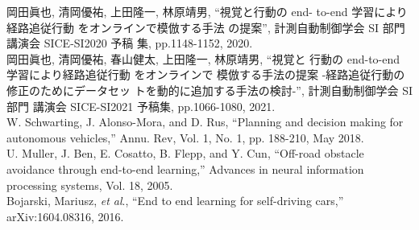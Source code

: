 \documentclass{jsarticle}
\begin{document}
\begin{thebibliography}{99}
  \small
  岡田眞也, 清岡優祐, 上田隆一, 林原靖男, “視覚と行動の end-
  to-end 学習により経路追従行動 をオンラインで模倣する手法
  の提案”, 計測自動制御学会 SI 部門講演会 SICE-SI2020 予稿
  集, pp.1148-1152, 2020.\\
  
  岡田眞也, 清岡優祐, 春山健太, 上田隆一, 林原靖男, “視覚と
  行動の end-to-end 学習により経路追従行動 をオンラインで
  模倣する手法の提案 -経路追従行動の修正のためにデータセッ
  トを動的に追加する手法の検討-”, 計測自動制御学会 SI 部門
  講演会 SICE-SI2021 予稿集, pp.1066-1080, 2021.\\
  
  W. Schwarting, J. Alonso-Mora, and D. Rus,
  “Planning and decision making for
  autonomous vehicles,” Annu. Rev, Vol. 1, No. 1, pp. 188-210, May 2018.\\
  
  U. Muller, J. Ben, E. Cosatto, B. Flepp, and Y. Cun, “Oﬀ-road obstacle avoidance
  through end-to-end learning,” Advances in neural information processing systems,
  Vol. 18, 2005.\\
  
  Bojarski, Mariusz, \textit{et al}.,
  “End to end learning for self-driving cars,” arXiv:1604.08316, 2016.\\

\end{thebibliography}
\end{document}

